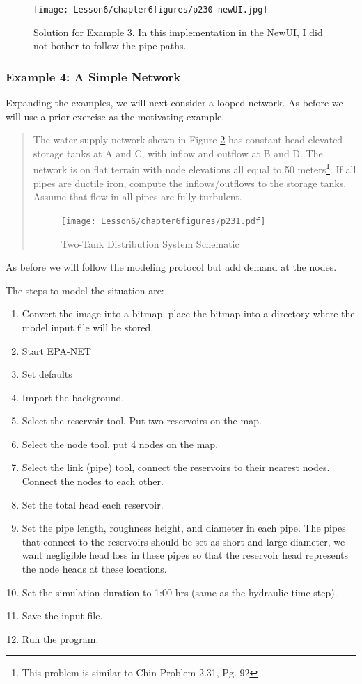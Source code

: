 \begin{figure}[h!] %
   \centering
   \texttt{[image: Lesson6/chapter6figures/p230-newUI.jpg]} 
   \caption{Solution for Example 3.  In this implementation in the NewUI, I did not bother to follow the pipe paths.}
   \label{fig:p230-newUI}
\end{figure}
\clearpage
\subsubsection{Example 4: A Simple Network}
Expanding the examples, we will next consider a looped network.   As before we will use a prior exercise as the motivating example.

\begin{quote}
The water-supply network shown in Figure \ref{fig:p231} has constant-head elevated storage tanks at A and C, with inflow and outflow at B and D.  The network is on flat terrain with node elevations all equal to 50 meters\footnote{This problem is similar to Chin Problem 2.31, Pg. 92}.  If all pipes are ductile iron, compute the inflows/outflows to the storage tanks.   Assume that flow in all pipes are fully turbulent.

\begin{figure}[htbp] %
   \centering
   \texttt{[image: Lesson6/chapter6figures/p231.pdf]} 
   \caption{Two-Tank Distribution System Schematic}
   \label{fig:p231}
\end{figure}
\end{quote}

As before we will follow the modeling protocol but add demand at the nodes.

The steps to model the situation are:
\begin{enumerate}
\item Convert the image into a bitmap, place the bitmap into a directory where the model input file will be stored.
\item Start EPA-NET
\item Set defaults
\item Import the background.
\item Select the reservoir tool.  Put two reservoirs on the map.
\item Select the node tool, put 4 nodes on the map.
\item Select the link (pipe) tool, connect the reservoirs to their nearest nodes.  Connect the nodes to each other.  
\item Set the total head each reservoir.
\item Set the pipe length, roughness height, and diameter in each pipe.  The pipes that connect to the reservoirs should be set as short and large diameter, we want negligible head loss in these pipes so that the reservoir head represents the node heads at these locations.
\item Set the simulation duration to 1:00 hrs (same as the hydraulic time step).
\item Save the input file.
\item Run the program.   
\end{enumerate}

